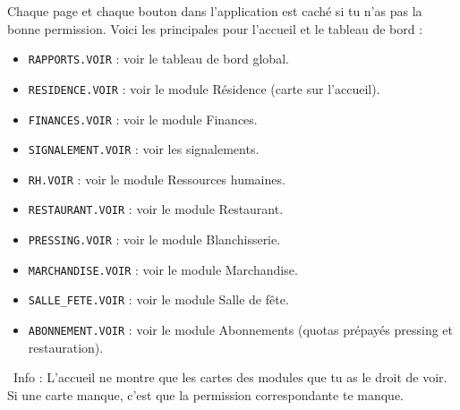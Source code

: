 \documentclass[12pt,a4paper]{article}
\newcommand{\info}[1]{\par\noindent\textcolor{lagoon}{\faInfoCircle\ Info : #1}\par}
\begin{document}
Chaque page et chaque bouton dans l'application est caché si tu n'as pas la bonne permission. Voici les principales pour l'accueil et le tableau de bord :

\begin{itemize}[label=\textcolor{lagoon}{\faKey}]
  \item \texttt{RAPPORTS.VOIR} : voir le tableau de bord global.
  \item \texttt{RESIDENCE.VOIR} : voir le module Résidence (carte sur l'accueil).
  \item \texttt{FINANCES.VOIR} : voir le module Finances.
  \item \texttt{SIGNALEMENT.VOIR} : voir les signalements.
  \item \texttt{RH.VOIR} : voir le module Ressources humaines.
  \item \texttt{RESTAURANT.VOIR} : voir le module Restaurant.
  \item \texttt{PRESSING.VOIR} : voir le module Blanchisserie.
  \item \texttt{MARCHANDISE.VOIR} : voir le module Marchandise.
  \item \texttt{SALLE\_FETE.VOIR} : voir le module Salle de fête.
  \item \texttt{ABONNEMENT.VOIR} : voir le module Abonnements (quotas prépayés pressing et restauration).
\end{itemize}

\info{L'accueil ne montre que les cartes des modules que tu as le droit de voir. Si une carte manque, c'est que la permission correspondante te manque.}

\vfill

\begin{center}
\end{center}
\end{document}
